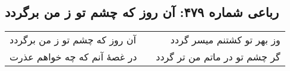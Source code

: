 \begin{center}
\section*{رباعی شماره ۴۷۹: آن روز که چشم تو ز من برگردد}
\label{sec:0479}
\begin{longtable}{l p{0.5cm} r}
آن روز که چشم تو ز من برگردد
&&
وز بهر تو کشتنم میسر گردد
\\
در غصهٔ آنم که چه خواهم عذرت
&&
گر چشم تو در ماتم من تر گردد
\\
\end{longtable}
\end{center}
